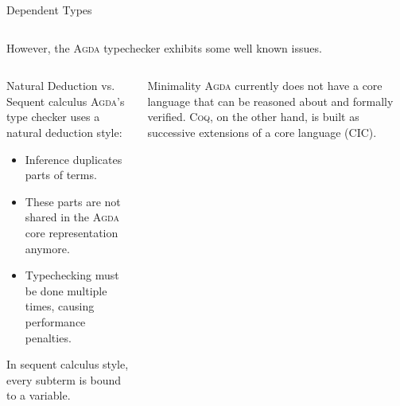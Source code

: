\documentclass[final, xcolor=svgnames]{beamer}
\newcommand{\coq}{\textsc{Coq}\xspace}
\newcommand{\agda}{\textsc{Agda}\xspace}
\begin{document}
\begin{frame}[shrink]
\begin{block}{Dependent Types}
\begin{columns}[t]
      However, the \agda typechecker exhibits some well known issues.
      
    \end{columns}
  \end{block}
  \vspace{2cm}
  \begin{columns}[T]
    \begin{block}{Natural Deduction vs. Sequent calculus}
      \agda's type checker uses a natural deduction style:
      \begin{itemize}
      \item Inference duplicates parts of terms.
      \item These parts are not shared in the \agda core representation anymore.
      \item Typechecking must be done multiple times, causing performance penalties.
      \end{itemize}
      In sequent calculus style, every subterm is bound to a variable.
      \begin{figure}
        \vspace{30pt}
        \centering
      \end{figure}
    \end{block}
    \begin{block}{Minimality}
      \agda currently does not have a core language that can be reasoned about and formally verified. \coq, on the other hand, is built as successive extensions of a core language (CIC).


\end{block}
\end{columns}
\end{frame}
\end{document}

